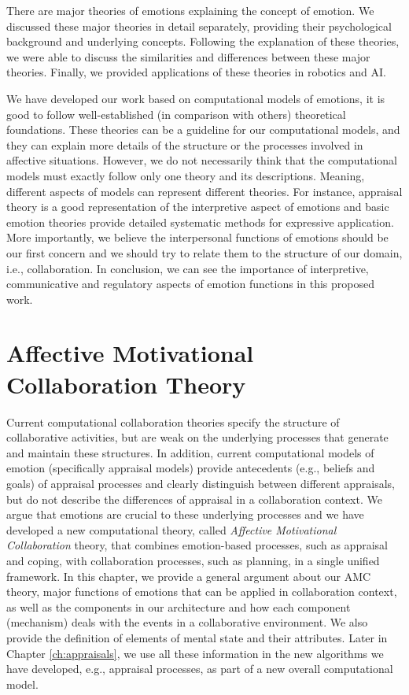 \documentclass[12pt]{report}
\begin{document}
There are major theories of emotions explaining the concept of emotion. We
discussed these major theories in detail separately, providing their
psychological background and underlying concepts. Following the explanation of
these theories, we were able to discuss the similarities and differences between
these major theories. Finally, we provided applications of these theories in
robotics and AI.

We have developed our work based on computational models of emotions, it is
good to follow well-established (in comparison with others) theoretical
foundations. These theories can be a guideline for our computational models, and
they can explain more details of the structure or the processes involved in
affective situations. However, we do not necessarily think that the
computational models must exactly follow only one theory and its descriptions.
Meaning, different aspects of models can represent different theories. For
instance, appraisal theory is a good representation of the interpretive aspect
of emotions and basic emotion theories provide detailed systematic methods for
expressive application. More importantly, we believe the interpersonal functions
of emotions should be our first concern and we should try to relate them to the
structure of our domain, i.e., collaboration. In conclusion, we can see the
importance of interpretive, communicative and regulatory aspects of emotion
functions in this proposed work.

\chapter{Affective Motivational Collaboration Theory}
\label{ch:amct}
\vspace*{-5mm}
Current computational collaboration theories specify the structure of
collaborative activities, but are weak on the underlying processes that generate
and maintain these structures. {\color{red}In addition, current computational
models of emotion (specifically appraisal models) provide antecedents (e.g.,
beliefs and goals) of appraisal processes and clearly distinguish between
different appraisals, but do not describe the differences of appraisal in a
collaboration context.} We argue that emotions are crucial to these underlying
processes and we have developed a new computational theory, called
\textit{Affective Motivational Collaboration} theory, that combines
emotion-based processes, such as appraisal and coping, with collaboration
processes, such as planning, in a single unified framework. {\color{red}In this
chapter, we provide a general argument about our AMC theory, major functions of
emotions that can be applied in collaboration context, as well as the components
in our architecture and how each component (mechanism) deals with the events in
a collaborative environment. We also provide the definition of elements of
mental state and their attributes. Later in Chapter \ref{ch:appraisals}, we use
all these information in the new algorithms we have developed, e.g., appraisal
processes, as part of a new overall computational model.}
\end{document}
